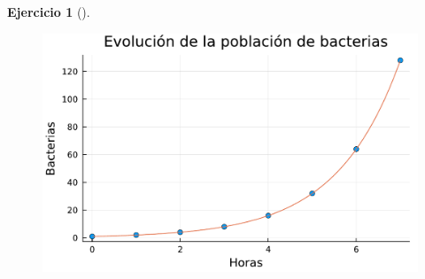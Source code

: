 \documentclass[
  a4paper,
]{scrreport}
\theoremstyle{definition}
\newtheorem{exercise}{Ejercicio}[chapter]
\theoremstyle{remark}
\begin{document}
\begin{exercise}[]
\begin{tcolorbox}
\begin{figure}[H]
{\centering \includegraphics{./funciones-elementales_files/figure-pdf/cell-4-output-1.pdf}

}

\end{figure}

\end{tcolorbox}

\end{exercise}
\end{document}
